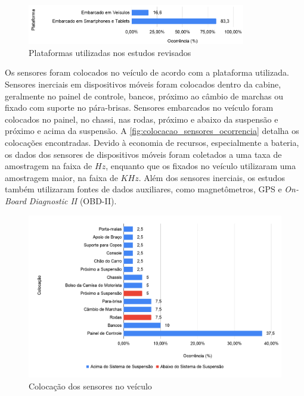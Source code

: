 \begin{figure}[h!]
  \centering
  \caption{Plataformas utilizadas nos estudos revisados}
   \label{fig:plataformas_ocorrencia}
   \includegraphics[width=0.85\textwidth]{figuras/fig_15.png}
\end{figure}

Os sensores foram colocados no veículo de acordo com a plataforma utilizada. Sensores inerciais em dispositivos móveis foram colocados dentro da cabine, geralmente no painel de controle, bancos, próximo ao câmbio de marchas ou fixado com suporte no pára-brisas. Sensores embarcados no veículo foram colocados no painel, no chassi, nas rodas, próximo e abaixo da suspensão e próximo e acima da suspensão. A \autoref{fig:colocacao_sensores_ocorrencia} detalha os colocações encontradas. Devido à economia de recursos, especialmente a bateria, os dados dos sensores de dispositivos móveis foram coletados a uma taxa de amostragem na faixa de $Hz$, enquanto que os fixados no veículo utilizaram uma amostragem maior, na faixa de $KHz$. Além dos sensores inerciais, os estudos também utilizaram fontes de dados auxiliares, como magnetômetros, GPS e \textit{On-Board Diagnostic II} (OBD-II).

\begin{figure}[h!]
  \centering
  \caption{Colocação dos sensores no veículo}
   \label{fig:colocacao_sensores_ocorrencia}
   \includegraphics[width=1\textwidth]{figuras/fig_16.png}
\end{figure}

